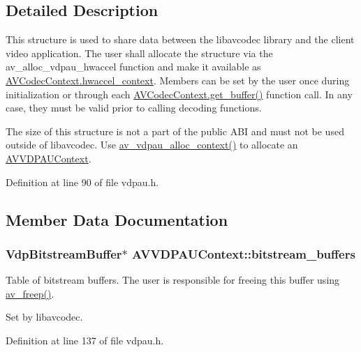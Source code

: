 \subsection{Detailed Description}
This structure is used to share data between the libavcodec library and the client video application. The user shall allocate the structure via the av\+\_\+alloc\+\_\+vdpau\+\_\+hwaccel function and make it available as \hyperlink{struct_a_v_codec_context_ab222f7d747dfdceff0a76999e09648c0}{A\+V\+Codec\+Context.\+hwaccel\+\_\+context}. Members can be set by the user once during initialization or through each \hyperlink{struct_a_v_codec_context_abc3a806b73306162efa218510448d54f}{A\+V\+Codec\+Context.\+get\+\_\+buffer()} function call. In any case, they must be valid prior to calling decoding functions.

The size of this structure is not a part of the public A\+BI and must not be used outside of libavcodec. Use \hyperlink{group__lavc__codec__hwaccel__vdpau_gac3b2e926326d9bc7c4a856304c4bc0f8}{av\+\_\+vdpau\+\_\+alloc\+\_\+context()} to allocate an \hyperlink{struct_a_v_v_d_p_a_u_context}{A\+V\+V\+D\+P\+A\+U\+Context}. 

Definition at line 90 of file vdpau.\+h.



\subsection{Member Data Documentation}
\subsubsection[{\texorpdfstring{bitstream\+\_\+buffers}{bitstream_buffers}}]{ Vdp\+Bitstream\+Buffer$\ast$ A\+V\+V\+D\+P\+A\+U\+Context\+::bitstream\+\_\+buffers}\hypertarget{struct_a_v_v_d_p_a_u_context_a669a2d63ad020507d8327df13a075cd2}{}\label{struct_a_v_v_d_p_a_u_context_a669a2d63ad020507d8327df13a075cd2}
Table of bitstream buffers. The user is responsible for freeing this buffer using \hyperlink{group__lavu__mem_ga0cc84043ea2167ad005c86e11d0bcdba}{av\+\_\+freep()}.

Set by libavcodec. 

Definition at line 137 of file vdpau.\+h.

